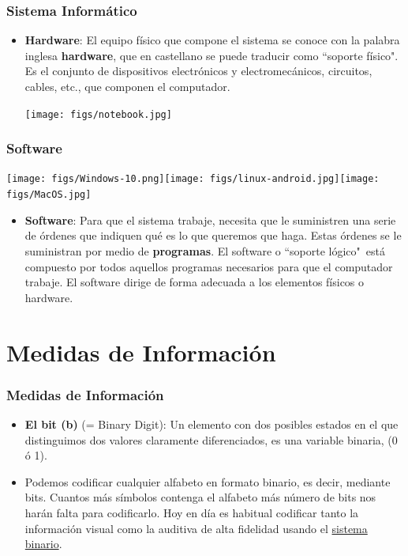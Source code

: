 \documentclass[aspectratio=169]{beamer}
\begin{document}
\begin{frame}[fragile]\frametitle{Sistema Informático}
\begin{itemize}
\item \textbf{Hardware}: El equipo físico que compone el sistema se conoce con la palabra inglesa \textbf{hardware}, que en castellano se puede traducir como ``soporte físico". Es el conjunto de dispositivos electrónicos y electromecánicos, circuitos, cables, etc., que componen el computador.
\begin{center}
\texttt{[image: figs/notebook.jpg]}
\end{center}
\end{itemize}
\end{frame}

\begin{frame}[fragile]\frametitle{Software}
\begin{center}
\texttt{[image: figs/Windows-10.png]}\hfill\texttt{[image: figs/linux-android.jpg]}\hfill\texttt{[image: figs/MacOS.jpg]}
\end{center}
\begin{itemize}
\item \textbf{Software}: Para que el sistema trabaje, necesita que le suministren una serie de órdenes que indiquen qué es lo que queremos que haga. Estas órdenes se le suministran por medio de \textbf{programas}. El software o ``soporte lógico"\, está compuesto por todos aquellos programas necesarios para que el computador trabaje. El software dirige de forma adecuada a los elementos físicos o hardware.
\end{itemize}
\end{frame}

\section{Medidas de Información}
\begin{frame}[fragile]\frametitle{Medidas de Información}
\begin{itemize}
\item \textbf{El bit (b)} (= Binary Digit): Un elemento con dos posibles estados en el que distinguimos dos valores claramente diferenciados, es una variable binaria, (0 ó 1).
\item Podemos codificar cualquier alfabeto en formato binario, es decir, mediante bits. Cuantos más símbolos contenga el alfabeto más número de bits nos harán falta para codificarlo. Hoy en día es habitual codificar tanto la información visual como la auditiva de alta fidelidad usando el \href{https://es.wikipedia.org/wiki/Sistema_binario}{sistema binario}.
\end{itemize}
\end{frame}
\end{document}
